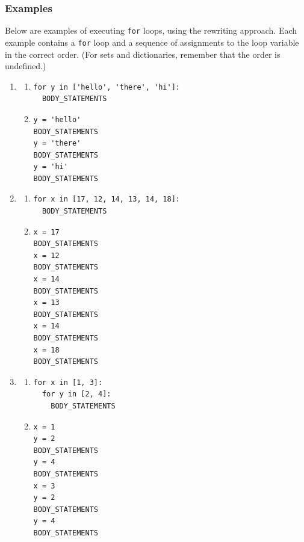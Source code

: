 \documentclass{article}
\newcommand{\expr}[1]{\texttt{#1}}
\newcommand{\kw}[1]{\expr{#1}}
\begin{document}
\subsubsection{Examples}

Below are examples of executing \kw{for} loops, using the rewriting
approach.  Each example contains a \kw{for} loop and a sequence of
assignments to the loop variable in the correct order.  (For sets and
dictionaries, remember that the order is undefined.)

  \begin{enumerate}
    \item
    \begin{enumerate}
      \item
\begin{verbatim}
for y in ['hello', 'there', 'hi']:
  BODY_STATEMENTS
\end{verbatim}
      \item
\begin{verbatim}
y = 'hello'
BODY_STATEMENTS
y = 'there'
BODY_STATEMENTS
y = 'hi'
BODY_STATEMENTS
\end{verbatim}
    \end{enumerate}

    \item
    \begin{enumerate}
      \item
\begin{verbatim}
for x in [17, 12, 14, 13, 14, 18]:
  BODY_STATEMENTS
\end{verbatim}
      \item
\begin{verbatim}
x = 17
BODY_STATEMENTS
x = 12
BODY_STATEMENTS
x = 14
BODY_STATEMENTS
x = 13
BODY_STATEMENTS
x = 14
BODY_STATEMENTS
x = 18
BODY_STATEMENTS
\end{verbatim}
    \end{enumerate}

    \item
    \begin{enumerate}
      \item
\begin{verbatim}
for x in [1, 3]:
  for y in [2, 4]:
    BODY_STATEMENTS
\end{verbatim}
      \item
\begin{verbatim}
x = 1
y = 2
BODY_STATEMENTS
y = 4
BODY_STATEMENTS
x = 3
y = 2
BODY_STATEMENTS
y = 4
BODY_STATEMENTS
\end{verbatim}
    \end{enumerate}


\end{enumerate}
\end{document}

